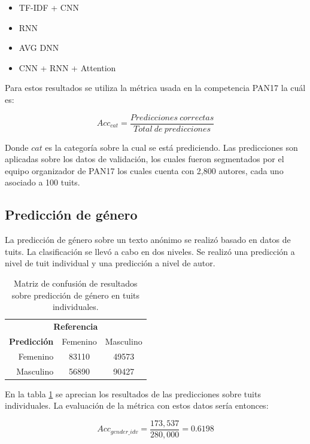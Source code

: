 \begin{itemize}
\item TF-IDF + CNN \parencite{schaetti2017author}
\item RNN \parencite{kodiyan2017author}
\item AVG DNN \parencite{franco2017author}
\item CNN + RNN + Attention \parencite{miura2017author}
\end{itemize}

Para estos resultados se utiliza la métrica usada en la competencia PAN17 la cuál es:


$$ Acc_{cat} = \frac{Predicciones\: correctas}{Total\: de\: predicciones} $$

Donde $cat$ es la categoría sobre la cual se está prediciendo. Las predicciones son aplicadas sobre los datos de validación, los cuales fueron segmentados por el equipo organizador de PAN17 los cuales cuenta con 2,800 autores, cada uno asociado a 100 tuits.

\subsection{Predicción de género}

La predicción de género sobre un texto anónimo se realizó basado en datos de tuits. La clasificación se llevó a cabo en dos niveles. Se realizó una predicción a nivel de tuit individual y una predicción a nivel de autor.

\begin{table}
\centering
\begin{tabular}{r | c c}
\multicolumn{3}{c}{\textbf{Referencia}} \\
\textbf{Predicción} & Femenino & Masculino \\
\hline
Femenino & 83110 & 49573 \\
Masculino & 56890 & 90427 \\
\end{tabular}
\caption{Matriz de confusión de resultados sobre predicción de género en tuits individuales.}
\label{tab:gender_indvtweet}
\end{table}

En la tabla \ref{tab:gender_indvtweet} se aprecian los resultados de las predicciones sobre tuits individuales. La evaluación de la métrica con estos datos sería entonces:

$$ Acc_{gender\_idv} = \frac{173,537}{280,000} = 0\text{.}6198 $$


